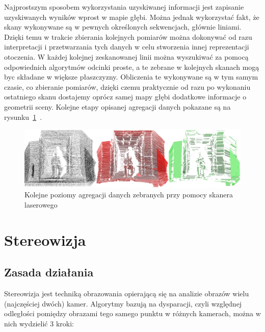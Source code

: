 Najprostszym sposobem wykorzystania uzyskiwanej informacji jest zapisanie
uzyskiwanych wyników wprost w mapie głębi. Można jednak wykorzystać fakt, że
skany wykonywane są w pewnych określonych sekwencjach, głównie liniami. Dzięki
temu w trakcie zbierania kolejnych pomiarów można dokonywać od razu
interpretacji i przetwarzania tych danych w celu stworzenia innej reprezentacji
otoczenia. W każdej kolejnej zeskanowanej linii można wyszukiwać za pomocą
odpowiednich algorytmów odcinki proste, a te zebrane w kolejnych skanach mogą
byc składane w większe płaszczyzny. Obliczenia te wykonywane są w tym samym
czasie, co zbieranie pomiarów, dzięki czemu praktycznie od razu po wykonaniu
ostatniego skanu dostajemy oprócz samej mapy głębi dodatkowe informacje o
geometrii sceny. Kolejne etapy opisanej agregacji danych
pokazane są na rysunku~\ref{fig:laser_aggregate}~\cite{Surmann01a3d}.

\begin{figure}[h!]
\centering
\includegraphics[width=12cm]{../../Common/img/laser_aggregate} 
\caption{Kolejne poziomy agregacji danych zebranych przy pomocy skanera
laserowego}
\label{fig:laser_aggregate}
\end{figure}

\section{Stereowizja}

\subsection{Zasada działania}

Stereowizja jest techniką obrazowania opierającą się na analizie obrazów wielu
(najczęściej dwóch) kamer. Algorytmy bazują na dysparacji, czyli względnej
odległości pomiędzy obrazami tego samego punktu w różnych kamerach, można w
nich wydzielić 3 kroki:

